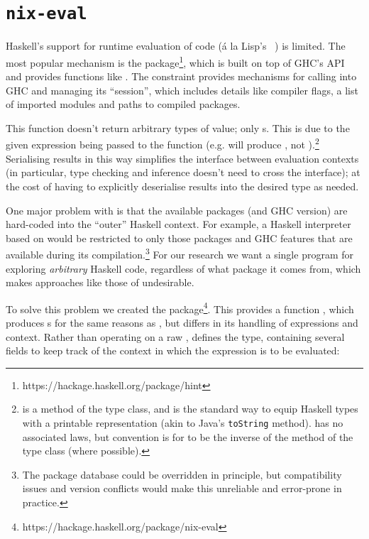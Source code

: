 \section{\texttt{nix-eval}}
\label{sec:nix-eval}

\begin{sloppypar}
  Haskell's support for runtime evaluation of code (\'a la Lisp's
  \eval{}~\cite[\S~1.6]{edwards1962lisp}) is limited. The most popular mechanism
  is the \hint{} package\footnote{https://hackage.haskell.org/package/hint},
  which is built on top of GHC's API and provides functions like
  . The
   constraint provides mechanisms for calling into GHC and
  managing its ``session'', which includes details like compiler flags, a list
  of imported modules and paths to compiled packages.

  This function doesn't return arbitrary types of value; only s. This
  is due to the given expression being passed to the  function (e.g.
   will produce , not
  ).\footnote{ is a method
    of the  type class, and is the standard way to equip Haskell types
    with a printable representation (akin to Java's \texttt{toString} method).
     has no associated laws, but convention is for  to be the
    inverse of the  method of the 
    type class (where possible).} Serialising results in this way simplifies the
  interface between evaluation contexts (in particular, type checking and
  inference doesn't need to cross the interface); at the cost of having to
  explicitly deserialise results into the desired type as needed.

  One major problem with \hint{} is that the available packages
  (and GHC version) are hard-coded into the ``outer'' Haskell context. For
  example, a Haskell interpreter based on \hint{} would be restricted to only
  those packages and GHC features that are available during its
  compilation.\footnote{The package database could be overridden in principle,
    but compatibility issues and version conflicts would make this unreliable
    and error-prone in practice.} For our research we want a single program for
  exploring \emph{arbitrary} Haskell code, regardless of what package it comes
  from, which makes approaches like those of \hint{} undesirable.

  To solve this problem we created the \nixeval{}
  package\footnote{https://hackage.haskell.org/package/nix-eval}. This provides
  a function , which produces s
  for the same reasons as \hint{}, but differs in its handling of expressions
  and context. Rather than operating on a raw , \nixeval{} defines
  the  type, containing several fields to keep track of the context in
  which the expression is to be evaluated:
\end{sloppypar}

